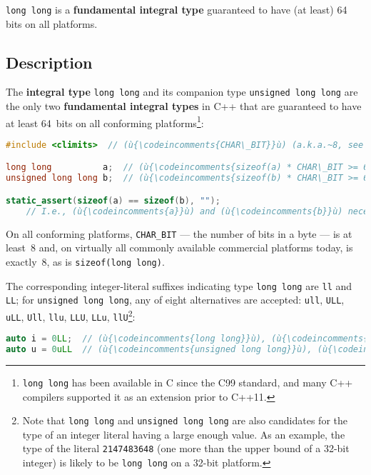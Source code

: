 

\texttt{long long} is a \textbf{fundamental integral type} guaranteed to have (at least) 64 bits on all
platforms.

\subsection[Description]{Description}\label{description}

The \textbf{integral type} \texttt{long}~\texttt{long} and its companion
type \texttt{unsigned}~\texttt{long}~\texttt{long} are the only two
\textbf{fundamental integral types} in C++ that are guaranteed to have
at least 64~bits on all conforming platforms{\cprotect\footnote{\texttt{long}~\texttt{long}
has been available in C since the C99 standard, and many C++ compilers
  supported it as an extension prior to C++11.}}:

\begin{lstlisting}[language=C++]
#include <climits>  // (ù{\codeincomments{CHAR\_BIT}}ù) (a.k.a.~8, see below)

long long          a;  // (ù{\codeincomments{sizeof(a) * CHAR\_BIT >= 64}}ù)
unsigned long long b;  // (ù{\codeincomments{sizeof(b) * CHAR\_BIT >= 64}}ù)

static_assert(sizeof(a) == sizeof(b), "");
    // I.e., (ù{\codeincomments{a}}ù) and (ù{\codeincomments{b}}ù) necessarily have the same size in every program.
\end{lstlisting}
    
\noindent On all conforming platforms, \texttt{CHAR\_BIT} --- the number of bits
in a byte --- is at least~8 and, on virtually all commonly available
commercial platforms today, is exactly~8, as is
\texttt{sizeof(long}~\texttt{long)}.

The corresponding integer-literal suffixes indicating type
\texttt{long}~\texttt{long} are \texttt{ll} and \texttt{LL}; for
\texttt{unsigned}~\texttt{long}~\texttt{long}, any of eight alternatives
are accepted: \texttt{ull}, \texttt{ULL}, \texttt{uLL}, \texttt{Ull},
\texttt{llu}, \texttt{LLU}, \texttt{LLu},
\texttt{llU}{\cprotect\footnote{Note that \texttt{long}~\texttt{long}
and \texttt{unsigned}~\texttt{long}~\texttt{long} are also candidates
for the type of an integer literal having a large enough value. As an
example, the type of the literal \texttt{2147483648} (one more than
the upper bound of a 32-bit integer) is likely to be
  \texttt{long}~\texttt{long} on a 32-bit platform.}}:

\begin{lstlisting}[language=C++]
auto i = 0LL;  // (ù{\codeincomments{long long}}ù), (ù{\codeincomments{sizeof(i) * CHAR\_BIT >= 64}}ù)
auto u = 0uLL  // (ù{\codeincomments{unsigned long long}}ù), (ù{\codeincomments{sizeof(u) * CHAR\_BIT >= 64}}ù)
\end{lstlisting}
    
